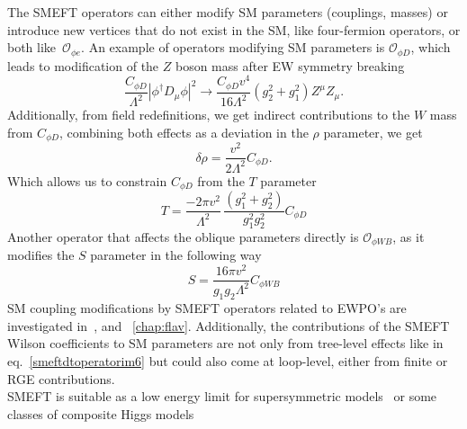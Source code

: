 The SMEFT operators can either modify SM parameters (couplings, masses) or introduce new vertices that do not exist in the SM, like four-fermion operators, or both like~$\mathcal{O}_{\phi e}$. An example of operators modifying SM parameters is $ \mathcal O_{\phi D}$, which leads to modification of the $Z$ boson mass after EW symmetry breaking 
\begin{equation}
\frac{C_{\phi D}}{\Lambda^2} | \phi^\dagger D_\mu \phi |^2 \to \frac{C_{\phi D} v^4}{16 \Lambda^2 } (g_2^2+g_1^2) Z^\mu Z_\mu.
	\label{smeftdtoperatorim6}
\end{equation}
Additionally, from field redefinitions, we get indirect contributions to the $W$ mass from $C_{\phi D}$, combining both effects as a deviation in the $\rho$ parameter, we get
\begin{equation}
\delta \rho = \frac{v^2}{2 \Lambda^2} C_{\phi D}.
	\label{rhosmeft}
\end{equation}
Which allows us to constrain $C_{\phi D}$ from the $T$ parameter 
\begin{equation}
	T = \frac{-2 \pi v^2}{\Lambda^2} \, \frac{(g_1^2 +g_2^2)}{g_1^2g_2^2} C_{\phi D}
	\label{smeftT}
\end{equation}
 Another operator that affects the oblique parameters directly is $\mathcal{O}_{\phi W B}$, as it modifies the $S$ parameter in the following way
\begin{equation}
S =\frac{16 \pi v^2}{g_1 g_2 \Lambda^2} C_{\phi W B}
	\label{smeftS}
\end{equation}
 SM coupling modifications by SMEFT operators related to EWPO's are investigated in~\cite{Alasfar:2020mne}, and ~\autoref{chap:flav}. Additionally, the contributions of the SMEFT Wilson coefficients to SM parameters are not only from tree-level effects like in eq.~\eqref{smeftdtoperatorim6} but could also come at loop-level, either from finite or RGE contributions.\\
SMEFT is suitable as a low energy limit for supersymmetric models~\cite{CARENA200363} or some classes of composite Higgs models~\cite{Contino:2010rs,Panico:2015jxa}

